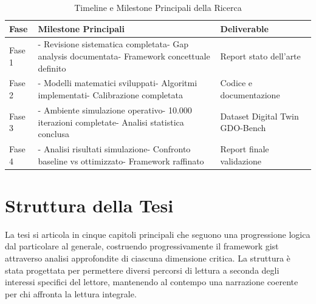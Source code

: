 \begin{table}[htbp]
\centering
 \small
 \sffamily 
\caption{Timeline e Milestone Principali della Ricerca}
\label{tab:timeline_ricerca}
\begin{tabularx}{\textwidth}{@{}lXl@{}}
\toprule
\textbf{Fase} & \textbf{Milestone Principali} & \textbf{Deliverable} \\
\midrule
Fase 1 &  - Revisione sistematica completata\newline- Gap analysis documentata\newline- Framework concettuale definito & Report stato dell'arte \\
Fase 2 & - Modelli matematici sviluppati\newline- Algoritmi implementati\newline- Calibrazione completata & Codice e documentazione \\
Fase 3 & - Ambiente simulazione operativo\newline- 10.000 iterazioni completate\newline- Analisi statistica conclusa & Dataset Digital Twin GDO-Bench \\
Fase 4 & - Analisi risultati simulazione\newline - Confronto baseline vs ottimizzato\newline - Framework raffinato & Report finale validazione \\
\bottomrule
\end{tabularx}
\end{table}

\section{\texorpdfstring{\textbf{Struttura della Tesi}}{1.6 - Struttura della Tesi}}
\label{sec:struttura_tesi}

La tesi si articola in cinque capitoli principali che seguono una progressione logica dal particolare al generale, costruendo progressivamente il framework \gls{gist} attraverso analisi approfondite di ciascuna dimensione critica. La struttura è stata progettata per permettere diversi percorsi di lettura a seconda degli interessi specifici del lettore, mantenendo al contempo una narrazione coerente per chi affronta la lettura integrale.

